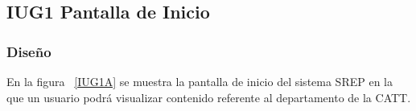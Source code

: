 \subsection{IUG1 Pantalla de Inicio}



\subsubsection{Diseño}

En la figura ~\ref{IUG1A} se muestra la pantalla de inicio del sistema SREP en la que un usuario podrá visualizar contenido referente al departamento de la CATT.



